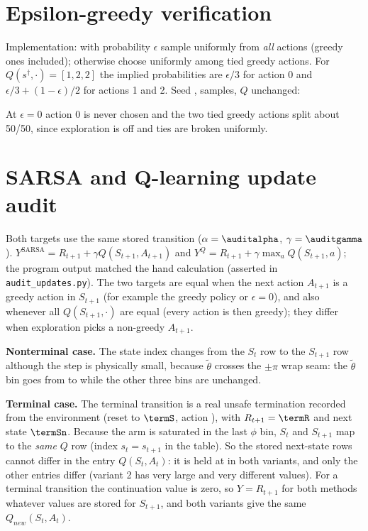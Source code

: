\documentclass[11pt]{article}
\begin{document}
\section{Epsilon-greedy verification}
Implementation: with probability $\epsilon$ sample uniformly from \emph{all} actions (greedy ones included); otherwise choose uniformly among tied greedy actions. For $Q(s^\dagger,\cdot)=[1,2,2]$ the implied probabilities are $\epsilon/3$ for action 0 and $\epsilon/3+(1-\epsilon)/2$ for actions 1 and 2. Seed \epsseed, \epsn{} samples, $Q$ unchanged:
\begin{center}\end{center}
At $\epsilon=0$ action 0 is never chosen and the two tied greedy actions split about 50/50, since exploration is off and ties are broken uniformly.

\section{SARSA and Q-learning update audit}
\begin{center}\small\end{center}
Both targets use the same stored transition ($\alpha=\auditalpha$, $\gamma=\auditgamma$). $Y^{\text{SARSA}}=R_{t+1}+\gamma Q(S_{t+1},A_{t+1})$ and $Y^{Q}=R_{t+1}+\gamma\max_a Q(S_{t+1},a)$; the program output matched the hand calculation (asserted in \texttt{audit\_updates.py}). The two targets are equal when the next action $A_{t+1}$ is a greedy action in $S_{t+1}$ (for example the greedy policy or $\epsilon=0$), and also whenever all $Q(S_{t+1},\cdot)$ are equal (every action is then greedy); they differ when exploration picks a non-greedy $A_{t+1}$.

\textbf{Nonterminal case.} The state index changes from the $S_t$ row to the $S_{t+1}$ row although the step is physically small, because $\widetilde\theta$ crosses the $\pm\pi$ wrap seam: the $\widetilde\theta$ bin goes from \seamFrom{} to \seamTo{} while the other three bins are unchanged.

\textbf{Terminal case.} The terminal transition is a real unsafe termination recorded from the environment (reset to $\termS$, action \termA), with $R_{t+1}=\termR$ and next state $\termSn$. Because the arm is saturated in the last $\phi$ bin, $S_t$ and $S_{t+1}$ map to the \emph{same} $Q$ row (index \mbox{$s_t=s_{t+1}$} in the table). So the stored next-state rows cannot differ in the entry $Q(S_t,A_t)$: it is held at \termQsa{} in both variants, and only the other entries differ (variant 2 has very large and very different values). For a terminal transition the continuation value is zero, so $Y=R_{t+1}$ for both methods whatever values are stored for $S_{t+1}$, and both variants give the same $Q_{new}(S_t,A_t)$.
\end{document}

